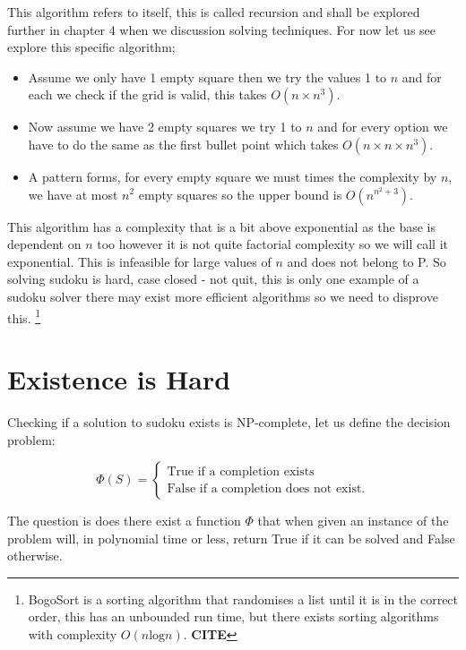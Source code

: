 \documentclass[a4paper,11pt]{report}
\begin{document}
This algorithm refers to itself, this is called recursion and shall be explored further in chapter 4 when we discussion solving techniques. For now let us see explore this specific algorithm; 
\begin{itemize}
\item Assume we only have 1 empty square then we try the values 1 to $n$ and for each we check if the grid is valid, this takes $O(n\times n^3)$.
\item Now assume we have 2 empty squares we try 1 to $n$ and for every option we have to do the same as the first bullet point which takes $O(n\times n \times n^3)$.
\item A pattern forms, for every empty square we must times the complexity by $n$, we have at most $n^2$ empty squares so the upper bound is $O(n^{n^2+3})$.
\end{itemize}
This algorithm has a complexity that is a bit above exponential as the base is dependent on $n$ too however it is not quite factorial complexity so we will call it exponential. This is infeasible for large values of $n$ and does not belong to P. So solving sudoku is hard, case closed - not quit, this is only one example   of a sudoku solver there may exist more efficient algorithms so we need to disprove this. \footnote{BogoSort is a sorting algorithm that randomises a list until it is in the correct order, this has an unbounded run time, but there exists sorting algorithms with complexity $O(n\text{log}n)$. \textbf{CITE}} 


\section{Existence is Hard}
		
Checking if a solution to sudoku exists is NP-complete, let us define the decision problem:

		\begin{equation}
		        \Phi (S) = \begin{cases}
		            \text{True if a completion exists} \\
		            \text{False if a completion does not exist}.
				\end{cases}
		\end{equation}

The question is does there exist a function $\Phi$ that when given an instance of the problem will, in polynomial time or less,
return True if it can be solved and False otherwise.
\end{document}

